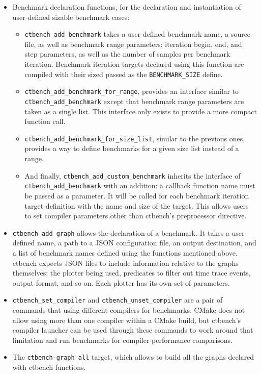 \documentclass[../main]{subfiles}
\begin{document}
\begin{itemize}

\item Benchmark declaration functions, for the declaration and instantiation
of user-defined sizable benchmark cases:

  \begin{itemize}

  \item
  \lstinline{ctbench_add_benchmark} takes a user-defined benchmark name,
  a \cpp source file, as well as benchmark range parameters: iteration begin,
  end, and step parameters, as well as the number of samples per benchmark
  iteration. Benchmark iteration targets declared using this function are
  compiled with their sized passed as the \lstinline{BENCHMARK_SIZE} define.

  \item
  \lstinline{ctbench_add_benchmark_for_range}, provides an interface similar to
  \lstinline{ctbench_add_benchmark} except that benchmark range parameters
  are taken as a single list. This interface only exists to provide a more
  compact function call.

  \item
  \lstinline{ctbench_add_benchmark_for_size_list}, similar to the previous ones,
  provides a way to define benchmarks for a given size list instead of a range.

  \item
  And finally, \lstinline{ctbench_add_custom_benchmark} inherits
  the interface of \lstinline{ctbench_add_benchmark} with an addition:
  a callback function name must be passed as a parameter. It will be called
  for each benchmark iteration target definition with the name and size of the
  target. This allows users to set compiler parameters other than ctbench's
  preprocessor directive.

  \end{itemize}

\item
\lstinline{ctbench_add_graph} allows the declaration of a benchmark.
It takes a user-defined name, a path to a JSON configuration file,
an output destination, and a list of benchmark names defined using the
functions mentioned above. ctbench expects JSON files to include information
relative to the graphs themselves: the plotter being used, predicates
to filter out time trace events, output format, and so on.
Each plotter has its own set of parameters.

\item
\lstinline{ctbench_set_compiler} and \lstinline{ctbench_unset_compiler}
are a pair of commands that using different compilers for benchmarks.
CMake does not allow using more than one compiler within a CMake build,
but ctbench's compiler launcher can be used through these commands
to work around that limitation and run benchmarks for compiler performance
comparisons.

\item
The \lstinline{ctbench-graph-all} target, which allows to build all the graphs
declared with ctbench functions.

\end{itemize}
\end{document}
